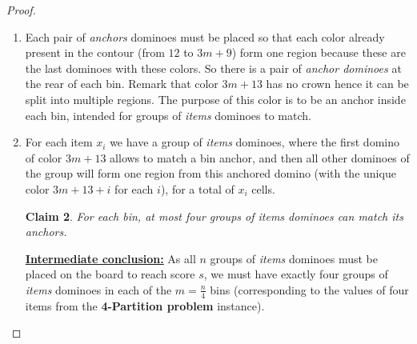 \documentclass[11pt,a4paper]{article}
\newtheorem{claim}{\textbf{Claim}}
\newcommand{\1}{\mathbb{1}}
\newcommand{\0}{\mathbb{0}}
\newcommand{\TODO}[1]{{\color{red}\fbox{TODO:} {\sf #1}}}
\begin{document}
\begin{proof}
\begin{enumerate}[topsep=.5em,itemsep=.5em]
\begin{claim}
        $\frac{k}{4}+2$ starting from the corresponding {\em contour} dominoes
        (separated by four positions), and joined with a pair of {\em zipper}
        dominoes.
      \end{claim}
      This also explains why {\em
      contour} dominoes are well aligned, with the third line of {\em contour}
      dominoes all on the same side of the square.\\[.5em]
      \underline{\bf Intermediate conclusion:} after these dominoes the
      K-tiling by $\tau$ with score $s$ must have created $m$ bins (with $m+1$
      arms) of size $4 \times (\frac{k}{4}+2)$. This size explains why the bin
      size (and consequently all item sizes) of the original {\bf 4-Partition
      problem} instance is converted to a multiple of $4$.
    \item Each pair of {\em anchors} dominoes must be placed so that each color
      already present in the contour (from $12$ to $3m+9$) form one region
      because these are the last dominoes with these colors. So there is a pair
      of {\em anchor dominoes} at the rear of each bin.
      Remark that color $3m+13$ has no crown hence it can be split into
      multiple regions. The purpose of this color is to be an anchor inside
      each bin, intended for groups of {\em items} dominoes to match.
    \item For each item $x_i$ we have a group of {\em items} dominoes, where the
      first domino of color $3m+13$ allows to match a bin anchor, and then all
      other dominoes of the group will form one region from this anchored
      domino (with the unique color $3m+13+i$ for each $i$), for a total
      of $x_i$ cells.
      \begin{claim}
        \label{claim:anchors}
        For each bin, at most four groups of {\em items} dominoes
        can match its anchors.
      \end{claim}
      \underline{\bf Intermediate conclusion:} As all $n$ groups of {\em items}
      dominoes must be placed on the board to reach score $s$, we must have
      exactly four groups of {\em items} dominoes in each of the
      $m=\frac{n}{4}$ bins (corresponding to the values of four items from the
      {\bf 4-Partition problem} instance).


\end{enumerate}
\end{proof}
\end{document}
